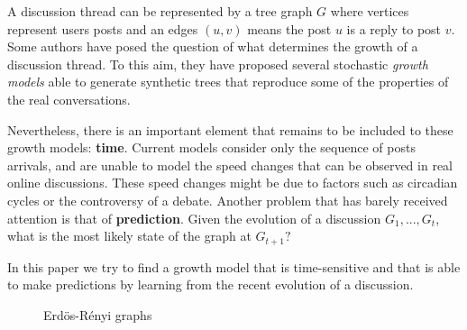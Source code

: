 \documentclass[smallextended]{svjour3}          %
\begin{document}
A discussion thread can be represented by a tree graph $G$ where vertices represent users posts and an edges $(u,v)$ means the post $u$ is a reply to post $v$. Some authors have posed the question of what determines the growth of a discussion thread. To this aim, they have proposed several stochastic \textit{growth models} able to generate synthetic trees that reproduce some of the properties of the real conversations. 

Nevertheless, there is an important element that remains to be included to these growth models: \textbf{time}. Current models consider only the sequence of posts arrivals, and are unable to model the speed changes that can be observed in real online discussions. These speed changes might be due to factors such as circadian cycles or the controversy of a debate. Another problem that has barely received attention is that of \textbf{prediction}. Given the evolution of a discussion $G_1,..., G_t$, what is the most likely state of the graph at $G_{t+1}?$ 

In this paper we try to find a growth model that is time-sensitive and that is able to make predictions by learning from the recent evolution of a discussion.


\begin{figure}
	\caption{Erdös-Rényi graphs}
	\label{fig:erdos_rendy}
\end{figure}
\end{document}
